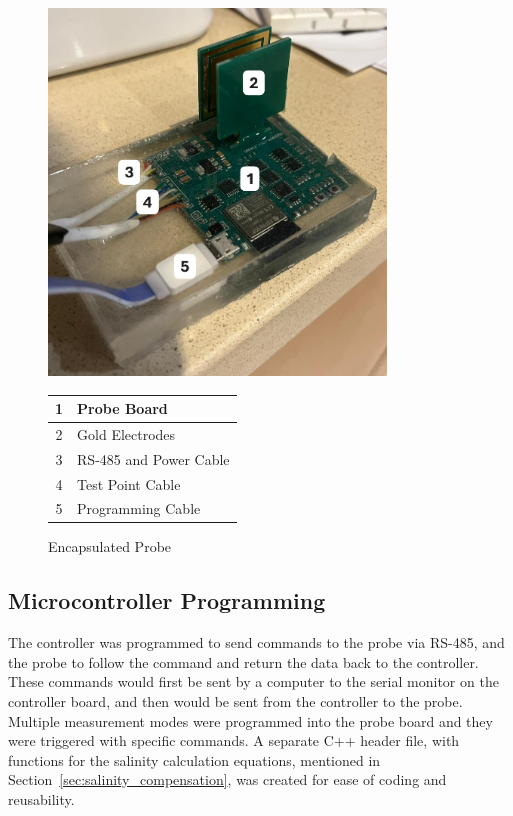 \begin{figure}[H]
    \begin{minipage}{0.5\textwidth}
        \centering
        \includegraphics[width=0.8\textwidth]{Figures/encapsulated_probe.jpg}
    \end{minipage}
    \begin{minipage}{0.5\textwidth}
        \centering
        \begin{tabular}{cl} \hline
            1 & Probe Board \\ \hline
            2 & Gold Electrodes \\ \hline
            3 & RS-485 and Power Cable \\ \hline
            4 & Test Point Cable \\ \hline
            5 & Programming Cable \\ \hline
        \end{tabular}
    \end{minipage}
    \caption{Encapsulated Probe}
    \label{fig:encapsulated_probe} %
\end{figure}

\subsection{Microcontroller Programming}\label{sec:uc_program}
The controller was programmed to send commands to the probe via RS-485, and the probe to follow the command and return the data back to the controller.
These commands would first be sent by a computer to the serial monitor on the controller board, and then would be sent from the controller to the probe.
Multiple measurement modes were programmed into the probe board and they were triggered with specific commands.
A separate C++ header file, with functions for the salinity calculation equations, mentioned in Section~\ref{sec:salinity_compensation}, was created for ease of coding and reusability.

